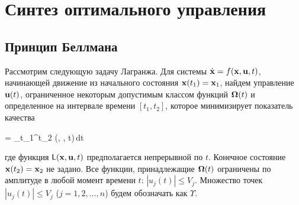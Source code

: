 


\chapter{Синтез оптимального управления}
\renewcommand{\funcF}{ \calf{F}           } %
\renewcommand{\optF}{  \optimum{\funcF}   } %
\newcommand{\optU}{    {\optimum{\m{u}}}  } %
\newcommand{\optX}{    {\optimum{\m{x}}}  } %
\newcommand{\funcL}{   \sff{L}            } %
\newcommand{\funcT}{   \optimum{\sff{F}}  } %
\newcommand{\funcV}{   \sff{V}            } %
\newcommand{\funcH}{   \optimum{H}        } %

\newcommand{\setS}{    \cale{S}           } %
\newcommand{\setV}{    \cale{V}           } %




\section{Принцип Беллмана}



Рассмотрим следующую задачу Лагранжа. Для системы $\dot{\mathbf{x}} = f(\mathbf{x}, \mathbf{u}, t)$, начинающей движение из начального состояния $\mathbf{x}(t_1) = \mathbf{x}_1$, найдем управление $\mathbf{u}(t)$, ограниченное некоторым допустимым классом функций $\mathbf{\Omega}(t)$ и определенное на интервале времени $[t_1, t_2]$, которое минимизирует показатель качества

    \funcF = \int\limits_{t_1}^{t_2} \funcL(, , t)\,dt \text{,}
\eeq

где функция $\funcL(\m{x}, \m{u}, t)$ предполагается непрерывной по $t$. Конечное состояние $\mathbf{x}(t_2) = \mathbf{x}_2$ не задано. Все функции, принадлежащие $\mathbf{\Omega}(t)$ ограничены по амплитуде в любой момент времени $t$: $|u_j(t)| \leqslant V_j$. Множество точек $|u_j(t)| \leqslant V_j$ ($j = 1, 2, \ldots, n$) будем обозначать как $\Upsilon$.


